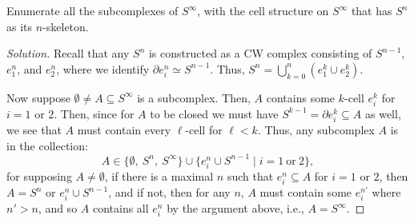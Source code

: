 \documentclass[12pt]{article}
\theoremstyle{remark}
\begin{document}
\begin{problem}
  Enumerate all the subcomplexes of $S^\infty$, with the cell structure on $S^\infty$ that has $S^n$ as its $n$-skeleton.
\end{problem}
\begin{proof}[Solution]
  Recall that any $S^n$ is constructed as a CW complex consisting of $S^{n-1}$, $e_1^n$, and $e_2^n$, where we identify $\partial e_i^n \simeq S^{n-1}$. Thus, $S^n = \bigcup_{k=0}^n (e_1^k \cup e_2^k)$.
  \par Now suppose $\emptyset \ne A \subseteq S^\infty$ is a subcomplex. Then, $A$ contains some $k$-cell $e_i^k$ for $i=1$ or $2$. Then, since for $A$ to be closed we must have $S^{k-1} = \partial e_i^k \subseteq A$ as well, we see that $A$ must contain every $\ell$-cell for $\ell < k$. Thus, any subcomplex $A$ is in the collection:
  \begin{equation*}
    A \in \{\emptyset,~S^n,~S^\infty\} \cup \{ e_i^n \cup S^{n-1}\mid i=1~\text{or}~2 \},
  \end{equation*}
  for supposing $A \ne \emptyset$, if there is a maximal $n$ such that $e_i^n \subseteq A$ for $i=1$ or $2$, then $A = S^n$ or $e_i^n \cup S^{n-1}$, and if not, then for any $n$, $A$ must contain some $e_i^{n'}$ where $n' > n$, and so $A$ contains all $e_i^n$ by the argument above, i.e., $A = S^\infty$.
\end{proof}
\end{document}
